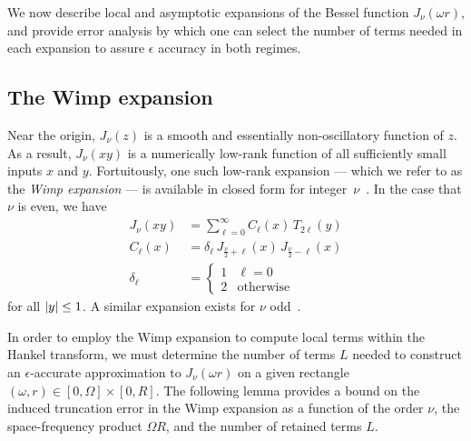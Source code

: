 We now describe local and asymptotic expansions of the Bessel function
$J_\nu(\omega r)$, and provide error analysis by which one can select the number
of terms needed in each expansion to assure $\epsilon$ accuracy in both regimes.

\subsection{The Wimp expansion}\label{sec:local}

Near the origin, $J_\nu(z)$ is a smooth and essentially non-oscillatory function
of $z$. As a result, $J_\nu(xy)$ is a numerically low-rank function of all
sufficiently small inputs $x$ and $y$. Fortuitously, one such low-rank expansion
--- which we refer to as the \textit{Wimp expansion} --- is available in closed
form for integer~$\nu$~\cite{wimp1962polynomial}. In the case that $\nu$ is
even, we have
\begin{equation}
    \begin{aligned}
        J_\nu(xy) 
        &= \sum_{\ell=0}^\infty C_\ell(x) \, T_{2\ell}(y) \\
        C_\ell(x) 
        &= \delta_\ell \, J_{\frac{\nu}{2} + \ell}(x) \, J_{\frac{\nu}{2} - \ell}(x) \\
        \delta_\ell 
        &= \begin{cases}
            1 & \ell=0 \\
            2 & \text{otherwise}
        \end{cases}
    \end{aligned}
\end{equation}
for all $\left|y\right| \leq 1$. A similar expansion exists for $\nu$
odd~\cite[2.23]{wimp1962polynomial}.

In order to employ the Wimp expansion to compute local terms within the Hankel
transform, we must determine the number of terms $L$ needed to construct an
$\epsilon$-accurate approximation to $J_\nu(\omega r)$ on a given rectangle
$(\omega, r) \in [0, \Omega] \times [0, R]$. The following lemma provides a
bound on the induced truncation error in the Wimp expansion as a function of the
order $\nu$, the space-frequency product $\Omega R$, and the number of retained
terms $L$.

